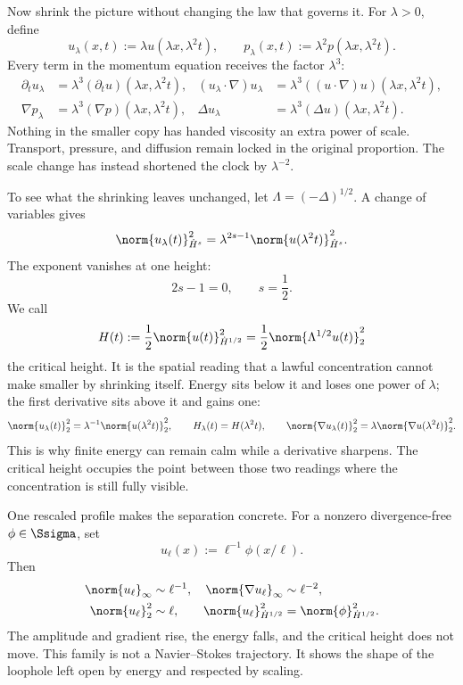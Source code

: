 
Now shrink the picture without changing the law that governs it.  For
\(\lambda>0\), define
\begin{equation}\label{eq:BodyNavierStokesScaling}
  u_\lambda(x,t):=\lambda u(\lambda x,\lambda^2t),
  \qquad
  p_\lambda(x,t):=\lambda^2p(\lambda x,\lambda^2t).
\end{equation}
Every term in the momentum equation receives the factor \(\lambda^3\):
\[
\begin{aligned}
  \partial_tu_\lambda
  &=\lambda^3(\partial_tu)(\lambda x,\lambda^2t),
  &
  (u_\lambda\cdot\nabla)u_\lambda
  &=\lambda^3((u\cdot\nabla)u)(\lambda x,\lambda^2t),
  \\
  \nabla p_\lambda
  &=\lambda^3(\nabla p)(\lambda x,\lambda^2t),
  &
  \Delta u_\lambda
  &=\lambda^3(\Delta u)(\lambda x,\lambda^2t).
\end{aligned}
\]
Nothing in the smaller copy has handed viscosity an extra power of scale.
Transport, pressure, and diffusion remain locked in the original proportion.
The scale change has instead shortened the clock by \(\lambda^{-2}\).

To see what the shrinking leaves unchanged, let
\(\Lambda=(-\Delta)^{1/2}\).  A change of variables gives
\begin{equation}\label{eq:BodyHomogeneousSobolevScaling}
  \norm{u_\lambda(t)}_{\dot H^s}^2
  =\lambda^{2s-1}\norm{u(\lambda^2t)}_{\dot H^s}^2.
\end{equation}
The exponent vanishes at one height:
\[
  2s-1=0,
  \qquad
  s=\frac12.
\]
We call
\begin{equation}\label{eq:BodyCriticalHeightDefinition}
  H(t):=\frac12\norm{u(t)}_{\dot H^{1/2}}^2
  =\frac12\norm{\Lambda^{1/2}u(t)}_2^2
\end{equation}
the critical height.  It is the spatial reading that a lawful concentration
cannot make smaller by shrinking itself.  Energy sits below it and loses one
power of \(\lambda\); the first derivative sits above it and gains one:
\[
  \norm{u_\lambda(t)}_2^2
  =\lambda^{-1}\norm{u(\lambda^2t)}_2^2,
  \qquad
  H_\lambda(t)=H(\lambda^2t),
  \qquad
  \norm{\nabla u_\lambda(t)}_2^2
  =\lambda\norm{\nabla u(\lambda^2t)}_2^2.
\]
This is why finite energy can remain calm while a derivative sharpens.  The
critical height occupies the point between those two readings where the
concentration is still fully visible.

One rescaled profile makes the separation concrete.  For a nonzero
divergence-free \(\phi\in\Ssigma\), set
\[
  u_\ell(x):=\ell^{-1}\phi(x/\ell).
\]
Then
\[
\begin{aligned}
  \norm{u_\ell}_\infty&\sim\ell^{-1},
  &\norm{\nabla u_\ell}_\infty&\sim\ell^{-2},
  \\
  \norm{u_\ell}_2^2&\sim\ell,
  &\norm{u_\ell}_{\dot H^{1/2}}^2
  &=\norm{\phi}_{\dot H^{1/2}}^2.
\end{aligned}
\]
The amplitude and gradient rise, the energy falls, and the critical height
does not move.  This family is not a Navier--Stokes trajectory.  It shows the
shape of the loophole left open by energy and respected by scaling.

